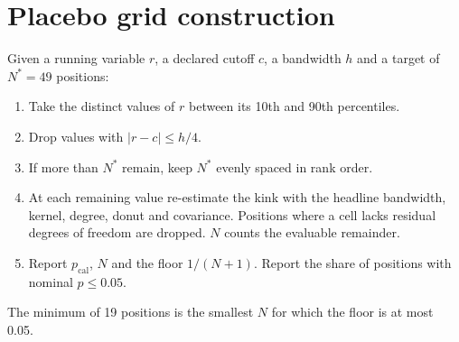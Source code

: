 \documentclass[11pt]{article}
\begin{document}
\appendix

\section{Placebo grid construction}\label{app:grid}

Given a running variable $r$, a declared cutoff $c$, a bandwidth $h$ and a target of
$N^\ast = 49$ positions:
\begin{enumerate}
\item Take the distinct values of $r$ between its 10th and 90th percentiles.
\item Drop values with $|r - c| \le h/4$.
\item If more than $N^\ast$ remain, keep $N^\ast$ evenly spaced in rank order.
\item At each remaining value re-estimate the kink with the headline bandwidth, kernel,
degree, donut and covariance. Positions where a cell lacks residual degrees of freedom
are dropped. $N$ counts the evaluable remainder.
\item Report $p_{\mathrm{cal}}$, $N$ and the floor $1/(N+1)$. Report the share of
positions with nominal $p \le 0.05$.
\end{enumerate}
The minimum of 19 positions is the smallest $N$ for which the floor is at most 0.05.
\end{document}
